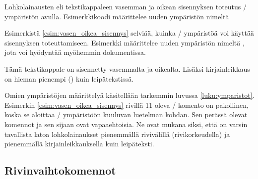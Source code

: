 \begin{esimerkki*}

\begin{koodilohko}
\newenvironment{lohkolainaus}{%
  \begin{list}{}{
      \setlength{\leftmargin}{1cm}
      \setlength{\rightmargin}{1cm}
      \setlength{\itemindent}{0bp}
      \setlength{\listparindent}{\parindent}
      \setlength{\parsep}{\parskip}
      \setlength{\topsep}{1em}
      \setlength{\partopsep}{0bp}
    }
  \item\linespread{1}\small
  }{\end{list}}
\end{koodilohko}
  \caption{Lohkolainausten eli tekstikappaleen vasemman ja oikean
    sisennyksen toteutus \-/ ympäristön avulla.
    Esimerkkikoodi määrittelee uuden ympäristön nimeltä
    }
  \label{esim:vasen_oikea_sisennys}
\end{esimerkki*}

Esimerkistä \ref{esim:vasen_oikea_sisennys} selviää, kuinka
\-/ ympäristöä voi käyttää sisennyksen toteuttamiseen.
Esimerkki määrittelee uuden ympäristön nimeltä
, jota voi hyödyntää myöhemmin dokumentissa.

\begin{koodilohkosis}
\begin{lohkolainaus}
  Tämä tekstikappale on sisennetty vasemmalta ja oikealta. Lisäksi
  kirjainleikkaus on hieman pienempi (\small) kuin leipätekstissä.
\end{lohkolainaus}
\end{koodilohkosis}

Omien ympäristöjen määrittelyä käsitellään tarkemmin luvussa
\ref{luku:ymparistot}. Esimerkin \ref{esim:vasen_oikea_sisennys} rivillä
11 oleva \-/ komento on pakollinen, koska se aloittaa
\-/ ympäristöön kuuluvan luetelman kohdan. Sen perässä
olevat komennot  ja  sen sijaan ovat
vapaaehtoisia. Ne ovat mukana siksi, että on varsin tavallista latoa
lohkolainaukset pienemmällä rivivälillä (rivikorkeudella) ja pienemmällä
kirjainleikkauksella kuin leipäteksti.

\subsection{Rivinvaihtokomennot}
\label{luku:rivinvaihtokomennot}

